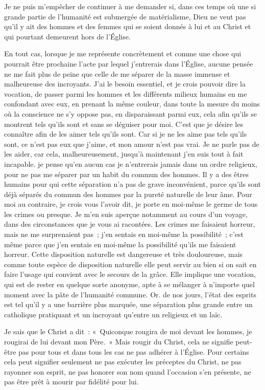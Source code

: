 \documentclass[french,twoside]{book} %
\begin{document}
Je ne puis m'empêcher de continuer à me demander si, dans ces temps où une si grande partie de l'humanité est submergée de matérialisme, Dieu ne veut pas qu'il y ait des hommes et des femmes qui se soient donnés à lui et au Christ et qui pourtant demeurent hors de l'Église.\par
En tout cas, lorsque je me représente concrètement et comme une chose qui pourrait être prochaine l'acte par lequel j'entrerais dans l'Église, aucune pensée ne me fait plus de peine que celle de me séparer de la masse immense et malheureuse des incroyants. J'ai le besoin essentiel, et je crois pouvoir dire la vocation, de passer parmi les hommes et les différents milieux humains en me confondant avec eux, en prenant la même couleur, dans toute la mesure du moins où la conscience ne s'y oppose pas, en disparaissant parmi eux, cela afin qu'ils se montrent tels qu'ils sont et sans se déguiser pour moi. C'est que je désire les connaître afin de les aimer tels qu'ils sont. Car si je ne les aime pas tels qu'ils sont, ce n'est pas eux que j'aime, et mon amour n'est pas vrai. Je ne parle pas de les aider, car cela, malheureusement, jusqu'à maintenant j'en suis tout à fait incapable. je pense qu'en aucun cas je n'entrerais jamais dans un ordre religieux, pour ne pas me séparer par un habit du commun des hommes. Il y a des êtres humains pour qui cette séparation n'a pas de grave inconvénient, parce qu'ils sont déjà séparés du commun des hommes par la pureté naturelle de leur âme. Pour moi au contraire, je crois vous l'avoir dit, je porte en moi-même le germe de tous les crimes ou presque. Je m'en suis aperçue notamment au cours d'un voyage, dans des circonstances que je vous ai racontées. Les crimes me faisaient horreur, mais ne me surprenaient pas ; j'en sentais en moi-même la possibilité ; c'est même parce que j'en sentais en moi-même la possibilité qu'ils me faisaient horreur. Cette disposition naturelle est dangereuse et très douloureuse, mais comme toute espèce de disposition naturelle elle peut servir au bien si on sait en faire l'usage qui convient avec le secours de la grâce. Elle implique une vocation, qui est de rester en quelque sorte anonyme, apte à se mélanger à n'importe quel moment avec la pâte de l'humanité commune. Or. de nos jours, l'état des esprits est tel qu'il y a une barrière plus marquée, une séparation plus grande entre un catholique pratiquant et un incroyant qu'entre un religieux et un laïc.\par
Je sais que le Christ a dit : « Quiconque rougira de moi devant les hommes, je rougirai de lui devant mon Père. » Mais rougir du Christ, cela ne signifie peut-être pas pour tous et dans tous les cas ne pas adhérer à l'Église. Pour certains cela peut signifier seulement ne pas exécuter les préceptes du Christ, ne pas rayonner son esprit, ne pas honorer son nom quand l'occasion s'en présente, ne pas être prêt à mourir par fidélité pour lui.\par
\end{document}
